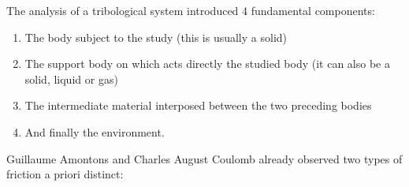 	The analysis of a tribological system introduced $4$ fundamental components: 
	\begin{enumerate}
		\item The body subject to the study (this is usually a solid)
		
		\item The support body on which acts directly the studied body (it can also be a solid, liquid or gas)
	
		\item The intermediate material interposed between the two preceding bodies
	
		\item And finally the environment.
	\end{enumerate}
	Guillaume Amontons and Charles August Coulomb already observed two types of friction a priori distinct:

